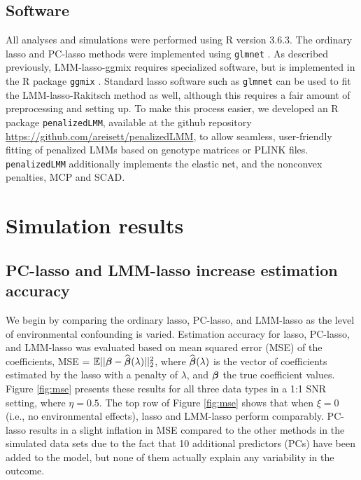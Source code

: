 \subsection{Software}
\label{sec:software}

All analyses and simulations were performed using R version 3.6.3. The ordinary lasso and PC-lasso methods were implemented using \texttt{glmnet} \citep{glmnet}. As described previously, LMM-lasso-ggmix requires specialized software, but is implemented in the R package \texttt{ggmix} \citep{bhatnagar2020simultaneous}. Standard lasso software such as \texttt{glmnet} can be used to fit the LMM-lasso-Rakitsch method as well, although this requires a fair amount of preprocessing and setting up. To make this process easier, we developed an R package \texttt{penalizedLMM}, available at the github repository \url{https://github.com/areisett/penalizedLMM}, to allow seamless, user-friendly fitting of penalized LMMs based on genotype matrices or PLINK files.  \texttt{penalizedLMM} additionally implements the elastic net, and the nonconvex penalties, MCP and SCAD. 

\section{Simulation results} \label{sec:results}

\subsection{PC-lasso and LMM-lasso increase estimation accuracy}
\label{sec:sim-mse}

We begin by comparing the ordinary lasso, PC-lasso, and LMM-lasso as the level of environmental confounding is varied. Estimation accuracy for lasso, PC-lasso, and LMM-lasso was evaluated based on mean squared error (MSE) of the coefficients, MSE = $\mathbb{E}||\boldsymbol{\beta}{} - \widehat{\boldsymbol{\beta}{}}(\lambda)||^2_2$, where $\widehat{\boldsymbol{\beta}{}}(\lambda)$ is the vector of coefficients estimated by the lasso with a penalty of $\lambda$, and $\boldsymbol{\beta}{}$ the true coefficient values.
Figure \ref{fig:mse} presents these results for all three data types in a 1:1 SNR setting, where $\eta = 0.5$. The top row of Figure \ref{fig:mse} shows that when $\xi = 0$ (i.e., no environmental effects), lasso and LMM-lasso perform comparably. PC-lasso results in a slight inflation in MSE compared to the other methods in the simulated data sets due to the fact that 10 additional predictors (PCs) have been added to the model, but none of them actually explain any variability in the outcome. 

